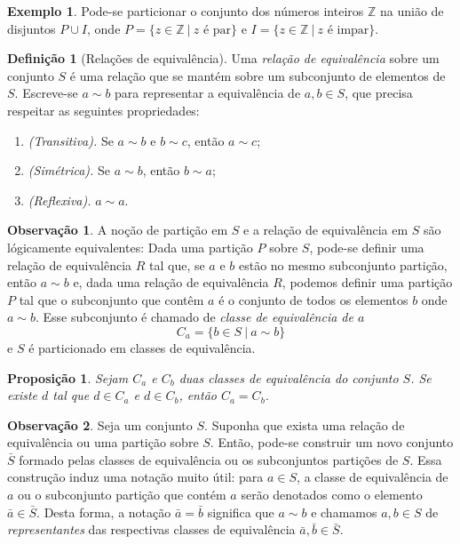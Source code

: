 \documentclass[a4paper,12pt]{report}
\theoremstyle{plain}
\newtheorem{proposicao}{Proposição}[section]
\theoremstyle{definition}
\newtheorem{definicao}{Definição}[section]
\newtheorem{observacao}{Observação}[section]
\newtheorem{exemplo}{Exemplo}[section]
\begin{document}
\begin{exemplo}
	Pode-se particionar o conjunto dos números inteiros
	\(\mathbb{Z}\) na união de disjuntos \(P\cup I\), onde
	\(P = \{z \in \mathbb{Z} \ |\ z \text{ é par}\}\) e
	\(I = \{z \in \mathbb{Z} \ |\ z \text{ é impar}\}\).
\end{exemplo}

\begin{definicao}[Relações de equivalência]
	Uma \emph{relação de equivalência} sobre um conjunto
	\(S\) é uma relação que se mantém sobre um subconjunto de elementos de
	\(S\). Escreve-se \(a\sim b\) para representar a equivalência de
	\(a, b \in S\), que precisa respeitar as seguintes propriedades:
	\begin{enumerate}
		\item \emph{(Transitiva).} Se \(a\sim b\) e \(b\sim c\), então \(a\sim c\);
		\item \emph{(Simétrica).} Se \(a\sim b\), então \(b\sim a\);
		\item \emph{(Reflexiva).} \(a\sim a\).
	\end{enumerate}
\end{definicao}

\begin{observacao}
	A noção de partição em \(S\) e a relação de equivalência em \(S\) são
	lógicamente equivalentes: Dada uma partição \(P\) sobre \(S\), pode-se
	definir uma relação de equivalência \(R\) tal que, se \(a\) e \(b\)
	estão no mesmo subconjunto partição, então \(a\sim b\) e, dada uma
	relação de equivalência \(R\), podemos definir uma partição \(P\) tal
	que o subconjunto que contêm \(a\) é o conjunto de todos os elementos
	\(b\) onde \(a\sim b\). Esse subconjunto é chamado de \emph{classe de
		equivalência de \(a\)}
	\[C_a = \{b\in S \ | \ a\sim b\}\]
	e \(S\) é particionado em classes de equivalência.
\end{observacao}

\begin{proposicao}
	Sejam \(C_a\) e \(C_b\) duas classes de equivalência do conjunto \(S\). Se existe \(d\) tal que \(d\in C_a\) e \(d\in C_b\), então \(C_a = C_b\).
\end{proposicao}

\begin{observacao}
	Seja um conjunto \(S\). Suponha que exista uma relação de equivalência
	ou uma partição sobre \(S\). Então, pode-se construir um novo conjunto
	\(\bar{S}\) formado pelas classes de equivalência ou os subconjuntos
	partições de \(S\). Essa construção induz uma notação muito útil: para
	\(a\in S\), a classe de equivalência de \(a\) ou o subconjunto partição
	que contém \(a\) serão denotados como o elemento
	\(\bar{a} \in \bar{S}\). Desta forma, a notação \(\bar{a} = \bar{b}\)
	significa que \(a \sim b\) e chamamos \(a,b \in S\) de
	\emph{representantes} das respectivas classes de equivalência
	\(\bar{a}, \bar{b} \in \bar{S}\).
\end{observacao}
\end{document}
